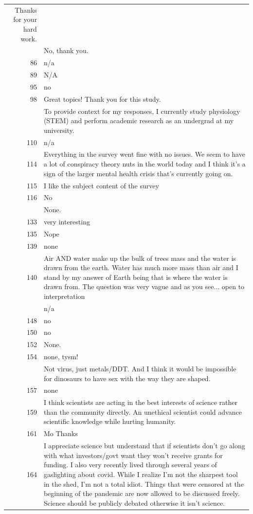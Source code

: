 \documentclass[
  doc,floatsintext]{apa6}
\begin{document}
\begin{longtable}[t]{>{}r>{\raggedright\arraybackslash}p{40em}}
Thanks for your hard work.\\
\addlinespace
84 & No, thank you.\\
86 & n/a\\
89 & N/A\\
95 & no\\
98 & Great topics! Thank you for this study.\\
\addlinespace
109 & To provide context for my responses, I currently study physiology (STEM) and perform academic research as an undergrad at my university.\\
110 & n/a\\
114 & Everything in the survey went fine with no issues. We seem to have a lot of conspiracy theory nuts in the world today and I think it's a sign of the larger mental health crisis that's currently going on.\\
115 & I like the subject content of the survey\\
116 & No\\
\addlinespace
132 & None.\\
133 & very interesting\\
135 & Nope\\
139 & none\\
140 & Air AND water make up the bulk of trees mass and the water is drawn from the earth. Water has much more mass than air and I stand by my answer of Earth being that is where the water is drawn from. The question was very vague and as you see... open to interpretation\\
\addlinespace
141 & n/a\\
148 & no\\
150 & no\\
152 & None.\\
154 & none, tysm!\\
\addlinespace
155 & Not virus, just metals/DDT. And I think it would be impossible for dinosaurs to have sex with the way they are shaped.\\
157 & none\\
159 & I think scientists are acting in the best interests of science rather than the community directly. An unethical scientist could advance scientific knowledge while hurting humanity.\\
161 & Mo Thanks\\
164 & I appreciate science but understand that if scientists don't go along with what investors/govt want they won't receive grants for funding. I also very recently lived through several years of gaslighting about covid. While I realize I'm not the sharpest tool in the shed, I'm not a total idiot. Things that were censored at the beginning of the pandemic are now allowed to be discussed freely. Science should be publicly debated otherwise it isn't science.\\

\end{longtable}
\end{document}
